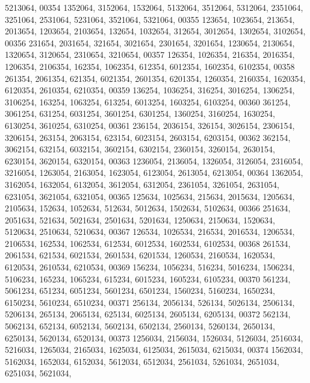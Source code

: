 \begin{DoxyCode}
      5213064,
00354       1352064, 3152064, 1532064, 5132064, 3512064, 5312064, 2351064, 3251064, 2531064, 5231064, 3521064, 
      5321064,
00355        123654, 1023654,  213654, 2013654, 1203654, 2103654,  132654, 1032654,  312654, 3012654, 1302654, 
      3102654,
00356        231654, 2031654,  321654, 3021654, 2301654, 3201654, 1230654, 2130654, 1320654, 3120654, 2310654, 
      3210654,
00357        126354, 1026354,  216354, 2016354, 1206354, 2106354,  162354, 1062354,  612354, 6012354, 1602354, 
      6102354,
00358        261354, 2061354,  621354, 6021354, 2601354, 6201354, 1260354, 2160354, 1620354, 6120354, 2610354, 
      6210354,
00359        136254, 1036254,  316254, 3016254, 1306254, 3106254,  163254, 1063254,  613254, 6013254, 1603254, 
      6103254,
00360        361254, 3061254,  631254, 6031254, 3601254, 6301254, 1360254, 3160254, 1630254, 6130254, 3610254, 
      6310254,
00361        236154, 2036154,  326154, 3026154, 2306154, 3206154,  263154, 2063154,  623154, 6023154, 2603154, 
      6203154,
00362        362154, 3062154,  632154, 6032154, 3602154, 6302154, 2360154, 3260154, 2630154, 6230154, 3620154, 
      6320154,
00363       1236054, 2136054, 1326054, 3126054, 2316054, 3216054, 1263054, 2163054, 1623054, 6123054, 2613054, 
      6213054,
00364       1362054, 3162054, 1632054, 6132054, 3612054, 6312054, 2361054, 3261054, 2631054, 6231054, 3621054, 
      6321054,
00365        125634, 1025634,  215634, 2015634, 1205634, 2105634,  152634, 1052634,  512634, 5012634, 1502634, 
      5102634,
00366        251634, 2051634,  521634, 5021634, 2501634, 5201634, 1250634, 2150634, 1520634, 5120634, 2510634, 
      5210634,
00367        126534, 1026534,  216534, 2016534, 1206534, 2106534,  162534, 1062534,  612534, 6012534, 1602534, 
      6102534,
00368        261534, 2061534,  621534, 6021534, 2601534, 6201534, 1260534, 2160534, 1620534, 6120534, 2610534, 
      6210534,
00369        156234, 1056234,  516234, 5016234, 1506234, 5106234,  165234, 1065234,  615234, 6015234, 1605234, 
      6105234,
00370        561234, 5061234,  651234, 6051234, 5601234, 6501234, 1560234, 5160234, 1650234, 6150234, 5610234, 
      6510234,
00371        256134, 2056134,  526134, 5026134, 2506134, 5206134,  265134, 2065134,  625134, 6025134, 2605134, 
      6205134,
00372        562134, 5062134,  652134, 6052134, 5602134, 6502134, 2560134, 5260134, 2650134, 6250134, 5620134, 
      6520134,
00373       1256034, 2156034, 1526034, 5126034, 2516034, 5216034, 1265034, 2165034, 1625034, 6125034, 2615034, 
      6215034,
00374       1562034, 5162034, 1652034, 6152034, 5612034, 6512034, 2561034, 5261034, 2651034, 6251034, 5621034, 

\end{DoxyCode}
